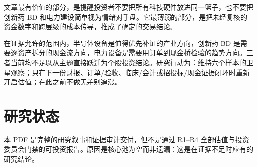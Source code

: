 \begin{houseviewbox}[最终结论]
文章最有价值的部分，是提醒投资者不要把所有科技硬件放进同一篮子，也不要把创新药 BD 和电力建设简单视为情绪对手盘。它最薄弱的部分，是把未经复核的资金数字和跨层级的成本传导，推成了确定的交易结论。

在证据允许的范围内，半导体设备是值得优先补证的产业方向，创新药 BD 是需要逐资产拆分的现金流方向，电力设备是需要用订单到现金桥检验的趋势方向。三者当前均不足以从主题直接跃迁为个股投资结论。研究行动为：维持六个样本的卫星观察；只在下一份财报、订单/验收、临床/会计或招投标/现金证据闭环时重新开启估值；在此之前不做无差别追涨。
\end{houseviewbox}

\section{研究状态}
本 PDF 是完整的研究叙事和证据审计交付，但不是通过 R1--R4 全部估值与投资委员会门禁的可投资报告。原因是核心池为空而非遗漏：这是在证据不足时应有的研究结论。
